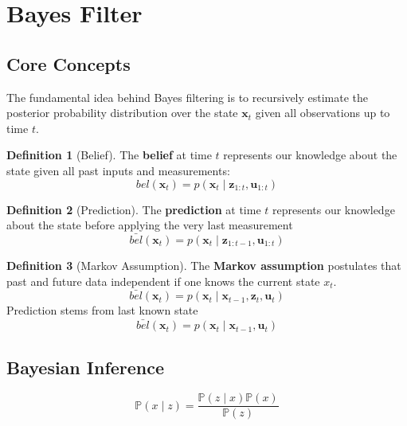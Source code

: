 \documentclass[14pt,letterpaper]{article}
\theoremstyle{definition}
\newtheorem{definition}{Definition}[section]
\newcommand{\prob}[1]{\mathbb{P}\left(#1\right)}
\newcommand{\state}{\bm{x}}
\newcommand{\obs}{\bm{z}}
\newcommand{\control}{\bm{u}}
\begin{document}
\section{Bayes Filter}

\subsection{Core Concepts}

The fundamental idea behind Bayes filtering is to recursively estimate the posterior probability distribution over the state $\state_t$ given all observations up to time $t$.

\begin{definition}[Belief]
The \textbf{belief} at time $t$ represents our knowledge about the state given all past inputs and measurements:
\begin{equation}
    bel(\state_t) = p(\state_t \mid \obs_{1:t}, \control_{1:t})
\end{equation}
\end{definition}

\begin{definition}[Prediction]
The \textbf{prediction} at time $t$ represents our knowledge about the state before applying the very last measurement
\begin{equation}
  \bar{bel}(\state_{t}) = p(\state_{t} \mid \obs_{1:t-1}, \control_{1:t})
\end{equation}
\end{definition}

\begin{definition}[Markov Assumption]
  The \textbf{Markov assumption} postulates that past and future data independent if one knows the current state $x_t$.
\begin{equation}
  \bar{bel}(\state_{t}) = p(\state_{t} \mid \state_{t-1}, \obs_{t}, \control_{t})
\end{equation}
\indent Prediction stems from last known state
\begin{equation}
  \bar{bel}(\state_{t}) = p(\state_{t} \mid \state_{t-1}, \control_{t})
\end{equation}
\end{definition}

\subsection{Bayesian Inference}
\begin{equation}
  \prob{x \mid z} = \frac{\prob{z \mid x}\prob{x}}{\prob{z}}
  \label{eq:Bayes equation}
\end{equation}
\end{document}
